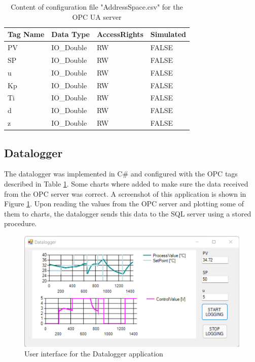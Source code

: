 \documentclass[conference]{IEEEtran}
\begin{document}
\begin{table}[H]
    \centering
    \begin{tabular}{ |l|l|l|l| }
        \hline
        Tag Name & Data Type & AccessRights & Simulated \\ 
        \hline \hline
        PV & IO\_Double & RW & FALSE \\ \hline
        SP & IO\_Double & RW & FALSE \\ \hline
        u & IO\_Double & RW & FALSE \\ \hline
        Kp & IO\_Double & RW & FALSE \\ \hline
        Ti & IO\_Double & RW & FALSE \\ \hline
        d & IO\_Double & RW & FALSE \\ \hline
        z & IO\_Double & RW & FALSE \\ \hline
\end{tabular}
\vspace{5pt}
\caption{Content of configuration file "AddressSpace.csv" for the OPC UA server}
\label{opc_address_space}
\end{table}

\subsection{Datalogger}
The datalogger was implemented in C\# and configured with the OPC tags described in Table \ref{opc_address_space}. Some charts where added to make sure the data received from the OPC server was correct. A screenshot of this application is shown in Figure \ref{datalogger}. Upon reading the values from the OPC server and plotting some of them to charts, the datalogger sends this data to the SQL server using a stored procedure.

\begin{figure}[H]
    \centering
    \includegraphics[scale=0.55]{media/datalogger2.png}
    \caption{User interface for the Datalogger application}
    \label{datalogger}    
\end{figure}
\end{document}
